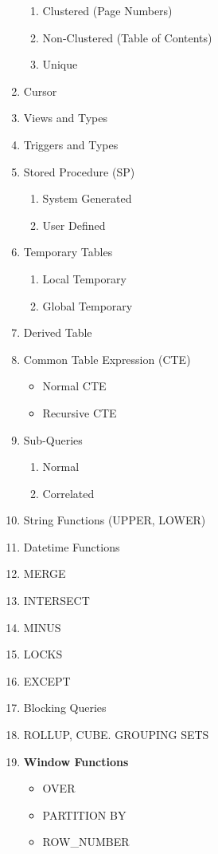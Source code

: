 \documentclass[11pt]{article}
\begin{document}
\begin{enumerate}
\begin{enumerate}
	\item Clustered (Page Numbers)
	\item Non-Clustered (Table of Contents)
	\item Unique
\end{enumerate}
\item Cursor
\item Views and Types 
\item Triggers and Types
\item Stored Procedure (SP)
\begin{enumerate}
	\item System Generated
	\item User Defined
\end{enumerate}
\item Temporary Tables
\begin{enumerate}
	\item Local Temporary
	\item Global Temporary
\end{enumerate}
\item Derived Table
\item Common Table Expression (CTE)
\begin{itemize}
	\item Normal CTE
	\item Recursive CTE
\end{itemize}
\item Sub-Queries
\begin{enumerate}
	\item Normal
	\item Correlated
\end{enumerate}
\item String Functions (UPPER, LOWER)
\item Datetime Functions
\item MERGE
 \item INTERSECT
\item MINUS
\item LOCKS
\item EXCEPT
\item Blocking Queries
\item ROLLUP, CUBE. GROUPING SETS
\item \textbf{Window Functions}
\begin{itemize}
	\item OVER
	\item PARTITION BY
	\item ROW\_NUMBER

\end{itemize}
\end{enumerate}
\end{document}
